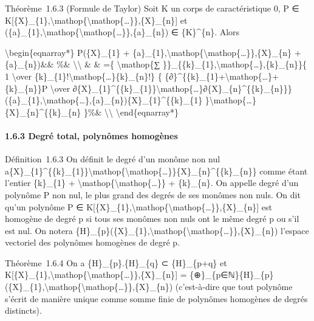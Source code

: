 \documentclass[]{article}
\begin{document}
Théorème~1.6.3 (Formule de Taylor) Soit K un corps de caractéristique 0,
P ∈
K{[}\{X\}\_\{1\},\textbackslash{}mathop\{\textbackslash{}mathop\{\ldots{}\}\},\{X\}\_\{n\}{]}
et
(\{a\}\_\{1\},\textbackslash{}mathop\{\textbackslash{}mathop\{\ldots{}\}\},\{a\}\_\{n\})
∈ \{K\}\^{}\{n\}. Alors

\textbackslash{}begin\{eqnarray*\} P(\{X\}\_\{1\} +
\{a\}\_\{1\},\textbackslash{}mathop\{\textbackslash{}mathop\{\ldots{}\}\},\{X\}\_\{n\}
+ \{a\}\_\{n\})\&\& \%\& \textbackslash{}\textbackslash{} \& \& =\{
\textbackslash{}mathop\{∑
\}\}\_\{\{k\}\_\{1\},\textbackslash{}mathop\{\ldots{}\},\{k\}\_\{n\}\}\{
1 \textbackslash{}over
\{k\}\_\{1\}!\textbackslash{}mathop\{\ldots{}\}\{k\}\_\{n\}!\} \{
\{∂\}\^{}\{\{k\}\_\{1\}+\textbackslash{}mathop\{\ldots{}\}+\{k\}\_\{n\}\}P
\textbackslash{}over
∂\{X\}\_\{1\}\^{}\{\{k\}\_\{1\}\}\textbackslash{}mathop\{\ldots{}\}∂\{X\}\_\{n\}\^{}\{\{k\}\_\{n\}\}\}
(\{a\}\_\{1\},\textbackslash{}mathop\{\ldots{}\},\{a\}\_\{n\})\{X\}\_\{1\}\^{}\{\{k\}\_\{1\}
\}\textbackslash{}mathop\{\ldots{}\}\{X\}\_\{n\}\^{}\{\{k\}\_\{n\}
\}\%\& \textbackslash{}\textbackslash{} \textbackslash{}end\{eqnarray*\}

\paragraph{1.6.3 Degré total, polynômes homogènes}

Définition~1.6.3 On définit le degré d'un monôme non nul
a\{X\}\_\{1\}\^{}\{\{k\}\_\{1\}\}\textbackslash{}mathop\{\textbackslash{}mathop\{\ldots{}\}\}\{X\}\_\{n\}\^{}\{\{k\}\_\{n\}\}
comme étant l'entier \{k\}\_\{1\} +
\textbackslash{}mathop\{\textbackslash{}mathop\{\ldots{}\}\} +
\{k\}\_\{n\}. On appelle degré d'un polynôme P non nul, le plus grand
des degrés de ses monômes non nuls. On dit qu'un polynôme P ∈
K{[}\{X\}\_\{1\},\textbackslash{}mathop\{\textbackslash{}mathop\{\ldots{}\}\},\{X\}\_\{n\}{]}
est homogène de degré p si tous ses monômes non nuls ont le même degré p
ou s'il est nul. On notera
\{H\}\_\{p\}(\{X\}\_\{1\},\textbackslash{}mathop\{\textbackslash{}mathop\{\ldots{}\}\},\{X\}\_\{n\})
l'espace vectoriel des polynômes homogènes de degré p.

Théorème~1.6.4 On a \{H\}\_\{p\}.\{H\}\_\{q\} ⊂ \{H\}\_\{p+q\} et
K{[}\{X\}\_\{1\},\textbackslash{}mathop\{\textbackslash{}mathop\{\ldots{}\}\},\{X\}\_\{n\}{]}
=
\{⊕\}\_\{p∈ℕ\}\{H\}\_\{p\}(\{X\}\_\{1\},\textbackslash{}mathop\{\textbackslash{}mathop\{\ldots{}\}\},\{X\}\_\{n\})
(c'est-à-dire que tout polynôme s'écrit de manière unique comme somme
finie de polynômes homogènes de degrés distincts).
\end{document}
